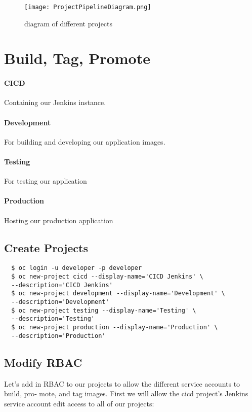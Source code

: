 \begin{figure}[ht]
  \caption{diagram of different projects}
  \centering
  \texttt{[image: ProjectPipelineDiagram.png]}
  \label{fig:ProjectPipelineDiagram}
\end{figure}

\section{Build, Tag, Promote}

\paragraph{CICD}
Containing our Jenkins instance.

\paragraph{Development}
For building and developing our application images.

\paragraph{Testing}
For testing our application

\paragraph{Production}
Hosting our production application

\subsection{Create Projects}
\begin{verbatim}
  $ oc login -u developer -p developer
  $ oc new-project cicd --display-name='CICD Jenkins' \
  --description='CICD Jenkins'  
  $ oc new-project development --display-name='Development' \
  --description='Development'
  $ oc new-project testing --display-name='Testing' \
  --description='Testing'
  $ oc new-project production --display-name='Production' \
  --description='Production'  
\end{verbatim}

\subsection{Modify RBAC}

Let’s add in RBAC to our projects to allow the different service accounts to build, pro‐ mote, and tag images. First we will allow the cicd project’s Jenkins service account edit access to all of our projects:

